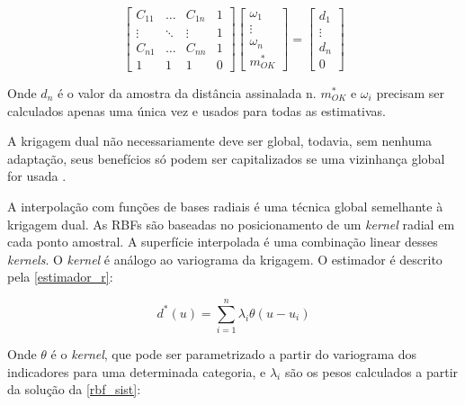 \begin{equation}
    \label{dual_k}
    \begin{bmatrix} 
    C_{11}&\dots&C_{1n}&1\\
    \vdots&\ddots&\vdots&1\\
    C_{n1}&\dots&C_{nn}&1\\ 
    1&1&1&0
    \end{bmatrix}
    \begin{bmatrix} 
    \omega_{1}\\
    \vdots\\
    \omega_{n}\\ 
    m^*_{OK}
    \end{bmatrix}
    =
    \begin{bmatrix} 
    d_{1}\\
    \vdots\\
    d_{n}\\ 
    0
    \end{bmatrix}
\end{equation}

Onde $d_{n}$ é o valor da amostra da distância assinalada n. $m^*_{OK}$ e $\omega_i$ precisam ser calculados apenas uma única vez e usados para todas as estimativas.

A krigagem dual não necessariamente deve ser global, todavia, sem nenhuma adaptação, seus benefícios só podem ser capitalizados se uma vizinhança global for usada \cite{aunon2000dual}.


A interpolação com funções de bases radiais \cite{fasshauer2007meshfree} é uma técnica global semelhante à krigagem dual. As RBFs são baseadas no posicionamento de um \textit{kernel} radial em cada ponto amostral. A superfície interpolada é uma combinação linear desses \textit{kernels}. O \textit{kernel} é análogo ao variograma da krigagem. O estimador é descrito pela \autoref{estimador_r}:

\begin{equation}
\label{estimador_r}
d^*(u)=\sum_{i=1}^{n} \lambda_i \theta(u - u_i)
\end{equation}

Onde $\theta$ é o \textit{kernel}, que pode ser parametrizado a partir do variograma dos indicadores para uma determinada categoria, e $\lambda_i$ são os pesos calculados a partir da solução da \autoref{rbf_sist}:

